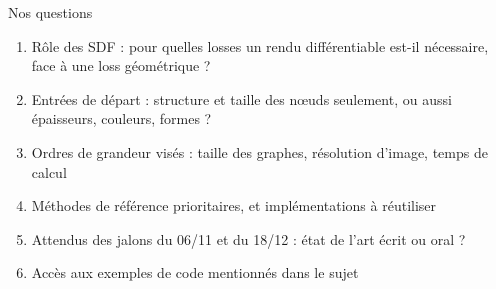 \documentclass[aspectratio=169,11pt]{beamer}
\begin{document}
\begin{frame}{Nos questions}
\begin{enumerate}
\setlength{\itemsep}{8pt}
\item Rôle des SDF : pour quelles losses un rendu différentiable est-il nécessaire, face à une loss géométrique ?
\item Entrées de départ : structure et taille des nœuds seulement, ou aussi épaisseurs, couleurs, formes ?
\item Ordres de grandeur visés : taille des graphes, résolution d'image, temps de calcul
\item Méthodes de référence prioritaires, et implémentations à réutiliser
\item Attendus des jalons du 06/11 et du 18/12 : état de l'art écrit ou oral ?
\item Accès aux exemples de code mentionnés dans le sujet
\end{enumerate}
\end{frame}
\end{document}
